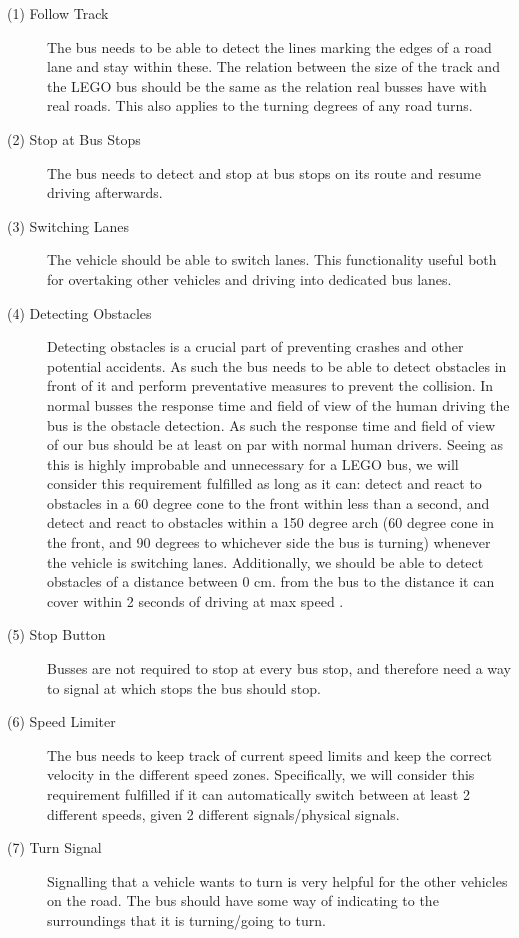 \begin{description}
    \item [(1) Follow Track]
    The bus needs to be able to detect the lines marking the edges of a road lane and stay within these. The relation between the size of the track and the LEGO bus should be the same as the relation real busses have with real roads. This also applies to the turning degrees of any road turns. 
    
    \item[(2) Stop at Bus Stops]
    The bus needs to detect and stop at bus stops on its route and resume driving afterwards. 

    \item[(3) Switching Lanes] 
    The vehicle should be able to switch lanes. This functionality useful both for overtaking other vehicles and driving into dedicated bus lanes. 
    
    \item[(4) Detecting Obstacles]
    Detecting obstacles is a crucial part of preventing crashes and other potential accidents. As such the bus needs to be able to detect obstacles in front of it and perform preventative measures to prevent the collision. In normal busses the response time and field of view of the human driving the bus is the obstacle detection. As such the response time and field of view of our bus should be at least on par with normal human drivers. Seeing as this is highly improbable and unnecessary for a LEGO bus, we will consider this requirement fulfilled as long as it can: detect and react to obstacles in a 60 degree cone to the front within less than a second, and detect and react to obstacles within a 150 degree arch (60 degree cone in the front, and 90 degrees to whichever side the bus is turning) whenever the vehicle is switching lanes. Additionally, we should be able to detect obstacles of a distance between 0 cm. from the bus to the distance it can cover within 2 seconds of driving at max speed \cite{holdAfstand}.

    
    \item[(5) Stop Button]
    Busses are not required to stop at every bus stop, and therefore need a way to signal at which stops the bus should stop. 
    
    \item[(6) Speed Limiter]
    The bus needs to keep track of current speed limits and keep the correct velocity in the different speed zones. Specifically, we will consider this requirement fulfilled if it can automatically switch between at least 2 different speeds, given 2 different signals/physical signals.
    
    \item[(7) Turn Signal]
    Signalling that a vehicle wants to turn is very helpful for the other vehicles on the road. The bus should have some way of indicating to the surroundings that it is turning/going to turn.
\end{description}

